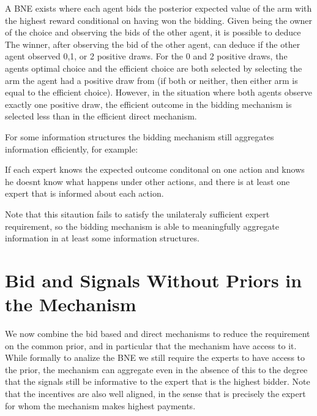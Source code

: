 A BNE exists where each agent bids the posterior expected value of the arm with the highest reward conditional on having won the bidding.
Given being the owner of the choice and observing the bids of the other agent, it is possible to deduce 
The winner, after observing the bid of the other agent, can deduce if the other agent observed 0,1, or 2 positive draws. For the 0 and 2 positive draws, the agents optimal choice and the efficient choice are both selected by selecting the arm the agent had a positive draw from (if both or neither, then either arm is equal to the efficient choice). 
However, in the situation where both agents observe exactly one positive draw, the efficient outcome in the bidding mechanism is selected less than in the efficient direct mechanism.


For some information structures the bidding mechanism still aggregates information efficiently, for example:

\begin{defn}
	If each expert knows the expected outcome conditonal on one action and knows he doesnt know what happens under other actions, and there is at least one expert that is informed about each action.
\end{defn}

Note that this sitaution fails to satisfy the unilateraly sufficient expert requirement, so the bidding mechanism is able to meaningfully aggregate information in at least some information structures. 





\section{Bid and Signals Without Priors in the Mechanism}

We now combine the bid based and direct mechanisms to reduce the requirement on the common prior, and in particular that the mechanism have access to it. 
While formally to analize the BNE we still require the experts to have access to the prior, the mechanism can aggregate even in the absence of this to the degree that the signals still be informative to the expert that is the highest bidder.
Note that the incentives are also well aligned, in the sense that is precisely the expert for whom the mechanism makes highest payments. 

